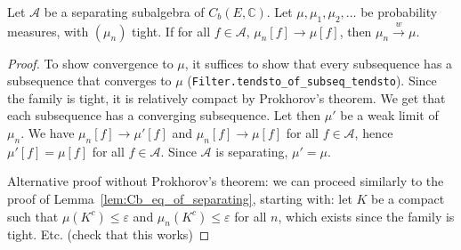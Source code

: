 \begin{lemma}\label{lem:cvg_of_separating}
Let $\mathcal A$ be a separating subalgebra of $C_b(E, \mathbb{C})$. Let $\mu, \mu_1, \mu_2, \ldots$ be probability measures, with $(\mu_n)$ tight. If for all $f \in \mathcal A$, $\mu_n[f] \to \mu[f]$, then $\mu_n \xrightarrow{w} \mu$.
\end{lemma}

\begin{proof}
To show convergence to $\mu$, it suffices to show that every subsequence has a subsequence that converges to $\mu$ (\texttt{Filter.tendsto\_of\_subseq\_tendsto}).
Since the family is tight, it is relatively compact by Prokhorov's theorem. We get that each subsequence has a converging subsequence.
Let then $\mu'$ be a weak limit of $\mu_n$. We have $\mu_n[f] \to \mu'[f]$ and $\mu_n[f] \to \mu[f]$ for all $f \in \mathcal A$, hence $\mu'[f] = \mu[f]$ for all $f \in \mathcal A$. Since $\mathcal A$ is separating, $\mathcal \mu' = \mu$.

Alternative proof without Prokhorov's theorem: we can proceed similarly to the proof of Lemma~\ref{lem:Cb_eq_of_separating}, starting with: let $K$ be a compact such that $\mu(K^c) \le \varepsilon$ and $\mu_n(K^c) \le \varepsilon$ for all $n$, which exists since the family is tight. Etc. (check that this works)
\end{proof}
